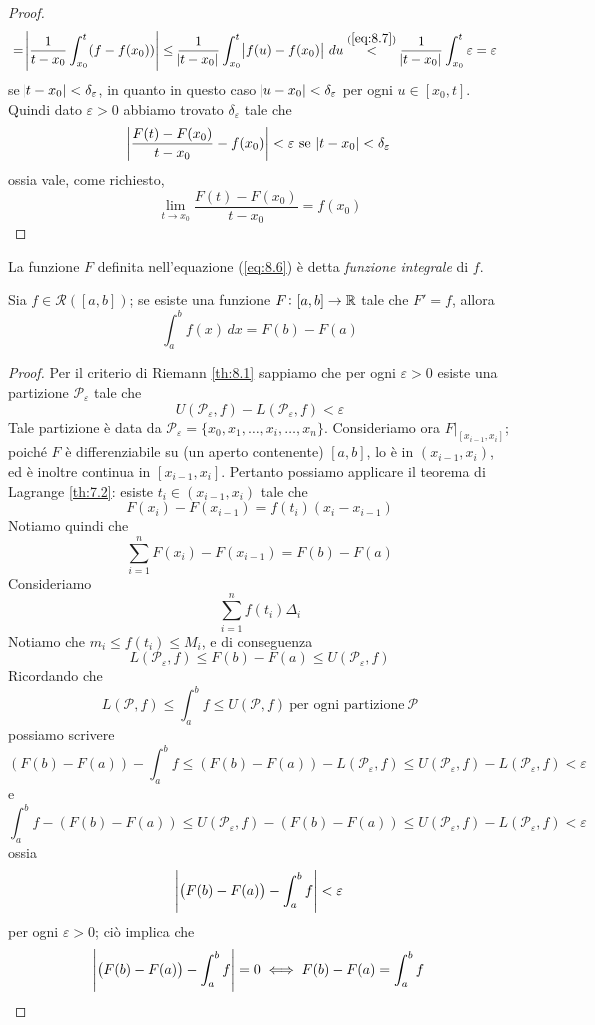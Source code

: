 \begin{proof}
\[\begin{split}
        & = \abs{\frac{1}{t-x_0}\int_{x_0}^t (f-f(x_0))}\le \frac{1}{\abs{t-x_0}}\int_{x_0}^t\abs{f(u)-f(x_0)}\, du \overset{(\ref{eq:8.7})}{<}\frac{1}{\abs{t-x_0}}\int_{x_0}^t \varepsilon = \varepsilon
    \end{split}
    \]
    se $\abs{t-x_0}<\delta_\varepsilon$, in quanto in questo caso $\abs{u-x_0}<\delta_\varepsilon$ per ogni $u\in[x_0,t]$. Quindi dato $\varepsilon>0$ abbiamo trovato $\delta_\varepsilon$ tale che
    \[
    \abs{\frac{F(t)-F(x_0)}{t-x_0}-f(x_0)}<\varepsilon \ \text{se} \ \abs{t-x_0}<\delta_\varepsilon
    \]
    ossia vale, come richiesto, 
    \[
    \lim_{t\to x_0} \frac{F(t)-F(x_0)}{t-x_0} = f(x_0)
    \]
\end{proof}
\begin{remark}
    La funzione $F$ definita nell'equazione (\ref{eq:8.6}) è detta \emph{funzione integrale} di $f$.
\end{remark}
\begin{theorem}
    \label{th:8.3}
    Sia $f\in\mathscr{R}([a,b])$; se esiste una funzione $F\colon[a,b]\to \amsbb{R}$ tale che $F'=f$, allora
    \[
    \int_a^b f(x)\, dx = F(b)-F(a)
    \]
\end{theorem}
\begin{proof}
    Per il criterio di Riemann \ref{th:8.1} sappiamo che per ogni $\varepsilon>0$ esiste una partizione $\mathscr{P}_\varepsilon$ tale che 
    \[
    U(\mathscr{P}_\varepsilon, f) - L(\mathscr{P}_\varepsilon, f)<\varepsilon
    \]
    Tale partizione è data da $\mathscr{P}_\varepsilon = \{x_0, x_1, \dots, x_i, \dots, x_n\}$. Consideriamo ora $F\Big|_{[x_{i-1}, x_i]}$; poiché $F$ è differenziabile su (un aperto contenente) $[a,b]$, lo è in $(x_{i-1}, x_i)$, ed è inoltre continua in $[x_{i-1}, x_i]$. Pertanto possiamo applicare il teorema di Lagrange \ref{th:7.2}: esiste $t_i\in(x_{i-1}, x_i)$ tale che
    \[
    F(x_i) -F(x_{i-1}) = f(t_i) (x_i - x_{i-1})
    \]
    Notiamo quindi che
    \[
    \sum_{i=1}^n F(x_i) -F(x_{i-1}) = F(b)-F(a)
    \]
    Consideriamo
    \[
    \sum_{i=1}^nf(t_i) \Delta_i
    \]
    Notiamo che $m_i \le f(t_i) \le M_i $, e di conseguenza
    \[
    L(\mathscr{P}_\varepsilon, f) \le F(b)-F(a) \le U(\mathscr{P}_\varepsilon, f)
    \]
    Ricordando che 
    \[
    L(\mathscr{P}, f) \le \int_a^b f \le U(\mathscr{P}, f) \ \text{per ogni partizione}\ \mathscr{P}
    \]
    possiamo scrivere
    \[
    \left(F(b)-F(a)\right)-\int_a^bf \le \left(F(b)-F(a)\right)-L(\mathscr{P}_\varepsilon, f) \le U(\mathscr{P}_\varepsilon, f)-L(\mathscr{P}_\varepsilon, f) < \varepsilon
    \]
    e
    \[
    \int_a^b f -\left(F(b)-F(a)\right)\le U(\mathscr{P}_\varepsilon, f) - \left(F(b)-F(a)\right) \le U(\mathscr{P}_\varepsilon, f) - L(\mathscr{P}_\varepsilon, f) <\varepsilon
    \]
    ossia
    \[
    \abs{\left(F(b)-F(a)\right)-\int_a^bf}<\varepsilon
    \]
    per ogni $\varepsilon>0$; ciò implica che
    \[
    \abs{\left(F(b)-F(a)\right)-\int_a^bf} = 0 \iff F(b)-F(a)=\int_a^bf
    \]
\end{proof}
